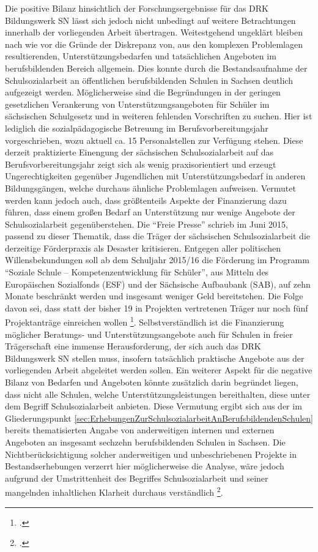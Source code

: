 Die positive Bilanz hinsichtlich der Forschungsergebnisse für das DRK Bildungswerk SN lässt sich jedoch nicht unbedingt auf weitere Betrachtungen innerhalb der vorliegenden Arbeit übertragen. Weitestgehend ungeklärt bleiben nach wie vor die Gründe der Diskrepanz von, aus den komplexen Problemlagen resultierenden, Unterstützungsbedarfen und tatsächlichen Angeboten im berufsbildenden Bereich allgemein. Dies konnte durch die Bestandsaufnahme der Schulsozialarbeit an öffentlichen berufsbildenden Schulen in Sachsen deutlich aufgezeigt werden. Möglicherweise sind die Begründungen in der geringen gesetzlichen Verankerung von Unterstützungsangeboten für Schüler im sächsischen Schulgesetz und in weiteren fehlenden Vorschriften zu suchen. Hier ist lediglich die sozialpädagogische Betreuung im Berufsvorbereitungsjahr vorgeschrieben, wozu aktuell ca. 15 Personalstellen zur Verfügung stehen. Diese derzeit praktizierte Einengung der sächsischen Schulsozialarbeit auf das Berufsvorbereitungsjahr zeigt sich als wenig praxisorientiert und erzeugt Ungerechtigkeiten gegenüber Jugendlichen mit Unterstützungsbedarf in anderen Bildungsgängen, welche durchaus ähnliche Problemlagen aufweisen. Vermutet werden kann jedoch auch, dass größtenteils Aspekte der Finanzierung dazu führen, dass einem großen Bedarf an Unterstützung nur wenige Angebote der Schulsozialarbeit gegenüberstehen. Die "`Freie Presse"' schrieb im Juni 2015, passend zu dieser Thematik, dass die Träger der sächsischen Schulsozialarbeit die derzeitige Förderpraxis als Desaster kritisieren. Entgegen aller politischen Willensbekundungen soll ab dem Schuljahr 2015/16 die Förderung im Programm "`Soziale Schule -- Kompetenzentwicklung für Schüler"', aus Mitteln des Europäischen Sozialfonds (ESF) und der Sächsische Aufbaubank (SAB), auf zehn Monate beschränkt werden und insgesamt weniger Geld bereitstehen. Die Folge davon sei, dass statt der bisher 19 in Projekten vertretenen Träger nur noch fünf Projektanträge einreichen wollen \footcite[vgl.]{FreiePresse2015}. Selbstverständlich ist die Finanzierung möglicher Beratungs- und Unterstützungsangebote auch für Schulen in freier Trägerschaft eine immense Herausforderung, der sich auch das DRK Bildungswerk SN stellen muss, insofern tatsächlich praktische Angebote aus der vorliegenden Arbeit abgeleitet werden sollen. Ein weiterer Aspekt für die negative Bilanz von Bedarfen und Angeboten könnte zusätzlich darin begründet liegen, dass nicht alle Schulen, welche Unterstützungsleistungen bereithalten, diese unter dem Begriff Schulsozialarbeit anbieten. Diese Vermutung ergibt sich aus der im Gliederungspunkt \ref{sec:ErhebungenZurSchulsozialarbeitAnBerufsbildendenSchulen} bereits thematisierten Angabe von anderweitigen internen und externen Angeboten an insgesamt sechzehn berufsbildenden Schulen in Sachsen. Die Nichtberücksichtigung solcher anderweitigen und unbeschriebenen Projekte in Bestandserhebungen verzerrt hier möglicherweise die Analyse, wäre jedoch aufgrund der Umstrittenheit des Begriffes Schulsozialarbeit und seiner mangelnden inhaltlichen Klarheit durchaus verständlich \footcite[vgl.][23]{Speck2007}.

